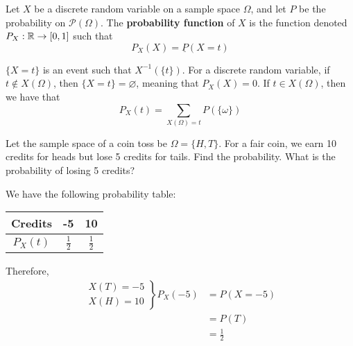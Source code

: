 \documentclass{article}
\begin{document}
	\begin{defn}
		Let $X$ be a discrete random variable on a sample space $\Omega$, and let $P$ be the probability on $\mathcal{P}(\Omega)$. The \textbf{probability function} of $X$ is the function denoted $P_X: \mathbb{R} \to [0,1]$ such that
		\vfill
		$$ P_X(X) = \underline{P}(X=t)$$
		\pagebreak
		\begin{rem}
			$\{X=t\}$ is an event such that $X^{-1} (\{ t\})$. For a discrete random variable, if $t \notin X(\Omega)$, then $\{X=t\} = \varnothing$, meaning that $P_X(X)=0$. If $t \in X(\Omega)$, then we have that
			$$ P_X(t) = \sum_{X(\Omega) = t} P(\{\omega\})$$
		\end{rem}
	\end{defn}
	\begin{exmp}
		Let the sample space of a coin toss be $\Omega = \{H, T\}$. For a fair coin, we earn 10 credits for heads but lose 5 credits for tails. Find the probability. What is the probability of losing 5 credits?
		\begin{sol}
			We have the following probability table:
			\begin{table}[h]
				\begin{tabular}{c|c|c|}
					Credits  & -5        & 10        \\ \hline
					$P_X(t)$ & $\frac12$ & $\frac12$
				\end{tabular}
			\end{table}
		
		\noindent
		Therefore, 
		\begin{align*}
			\left. \begin{array}{c}
			X(T) =-5 \\
			X(H) = 10
			\end{array} \right\} P_X(-5) &= P(X=-5) \\
			&= P(T) \\
			&= \frac12
		\end{align*}
		\end{sol}
	\end{exmp}
\end{document}
